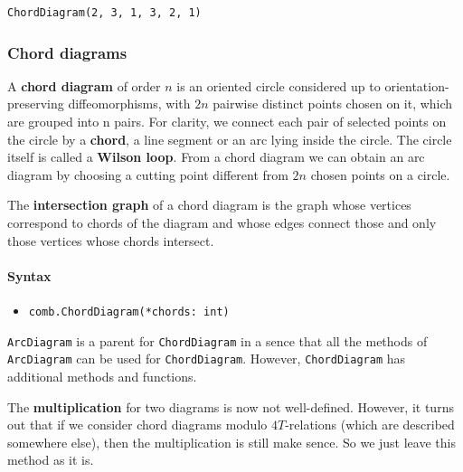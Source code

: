 \documentclass[11pt]{article}
\makeatletter
\providecommand{\tightlist}{%
      \setlength{\itemsep}{0pt}\setlength{\parskip}{0pt}}
\newcommand{\boxspacing}{\kern\kvtcb@left@rule\kern\kvtcb@boxsep}
\newcommand{\prompt}[4]{
        {\ttfamily\llap{{\color{#2}[#3]:\hspace{3pt}#4}}\vspace{-\baselineskip}}
    }
\makeatother
\begin{document}
            \begin{tcolorbox}[breakable, size=fbox, boxrule=.5pt, pad at break*=1mm, opacityfill=0]
\prompt{Out}{outcolor}{30}{\boxspacing}
\begin{Verbatim}[commandchars=\\\{\}]
ChordDiagram(2, 3, 1, 3, 2, 1)
\end{Verbatim}
\end{tcolorbox}
        
    \subsubsection{Chord diagrams}\label{chord-diagrams}

    A \textbf{chord diagram} of order \(n\) is an oriented circle considered
up to orientation-preserving diffeomorphisms, with \(2n\) pairwise
distinct points chosen on it, which are grouped into n pairs. For
clarity, we connect each pair of selected points on the circle by a
\textbf{chord}, a line segment or an arc lying inside the circle. The
circle itself is called a \textbf{Wilson loop}. From a chord diagram we
can obtain an arc diagram by choosing a cutting point different from
\(2n\) chosen points on a circle.

The \textbf{intersection graph} of a chord diagram is the graph whose
vertices correspond to chords of the diagram and whose edges connect
those and only those vertices whose chords intersect.

    \paragraph{Syntax}\label{syntax}

    \begin{itemize}
\tightlist
\item
  \texttt{comb.ChordDiagram(*chords:\ int)}
\end{itemize}

    \texttt{ArcDiagram} is a parent for \texttt{ChordDiagram} in a sence
that all the methods of \texttt{ArcDiagram} can be used for
\texttt{ChordDiagram}. However, \texttt{ChordDiagram} has additional
methods and functions.

    The \textbf{multiplication} for two diagrams is now not well-defined.
However, it turns out that if we consider chord diagrams modulo
\(4T\)-relations (which are described somewhere else), then the
multiplication is still make sence. So we just leave this method as it
is.
\end{document}
